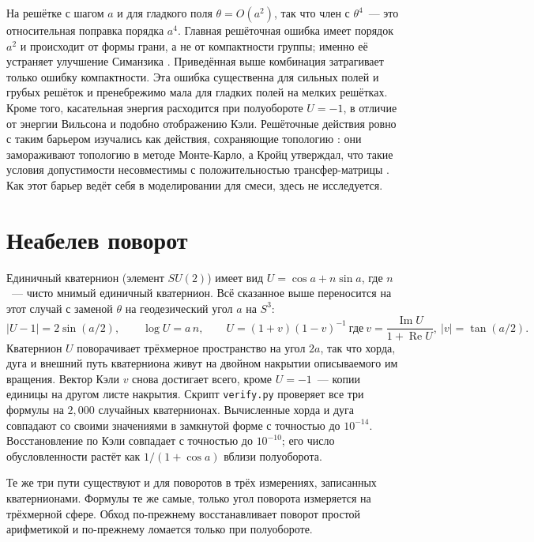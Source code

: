 \begin{remark}
На решётке с шагом $a$ и для гладкого поля $\theta=O(a^2)$, так что член с $\theta^4$~--- это
относительная поправка порядка $a^4$. Главная решёточная ошибка имеет порядок $a^2$ и
происходит от формы грани, а не от компактности группы; именно её устраняет улучшение
Симанзика \cite{lw}. Приведённая выше комбинация затрагивает только ошибку компактности.
Эта ошибка существенна для сильных полей и грубых решёток и пренебрежимо мала для гладких
полей на мелких решётках. Кроме того, касательная энергия расходится при полуобороте $U=-1$,
в отличие от энергии Вильсона и подобно отображению Кэли. Решёточные действия ровно с таким
барьером изучались как действия, сохраняющие топологию \cite{luscher,fukaya}: они замораживают
топологию в методе Монте-Карло, а Кройц утверждал, что такие условия допустимости несовместимы с
положительностью трансфер-матрицы \cite{creutz}. Как этот барьер ведёт себя в моделировании для
смеси, здесь не исследуется.
\end{remark}

\section{Неабелев поворот}\label{sec:su2}

Единичный кватернион (элемент $SU(2)$) имеет вид $U=\cos a+n\sin a$, где $n$~--- чисто мнимый
единичный кватернион. Всё сказанное выше переносится на этот случай с заменой $\theta$ на
геодезический угол $a$ на $S^3$:
\[
|U-1|=2\sin(a/2),\qquad \log U=a\,n,\qquad
U=(1+v)(1-v)^{-1}\ \text{где}\ v=\frac{\operatorname{Im}U}{1+\operatorname{Re}U},\ |v|=\tan(a/2).
\]
Кватернион $U$ поворачивает трёхмерное пространство на угол $2a$, так что хорда, дуга и внешний
путь кватерниона живут на двойном накрытии описываемого им вращения. Вектор Кэли $v$
снова достигает всего, кроме $U=-1$~--- копии единицы на другом листе накрытия.
Скрипт \texttt{verify.py} проверяет все три формулы на $2{,}000$ случайных кватернионах. Вычисленные хорда
и дуга совпадают со своими значениями в замкнутой форме с точностью до $10^{-14}$. Восстановление по Кэли совпадает с точностью до
$10^{-10}$; его число обусловленности растёт как $1/(1+\cos a)$ вблизи полуоборота.

\begin{plain}
Те же три пути существуют и для поворотов в трёх измерениях, записанных кватернионами.
Формулы те же самые, только угол поворота измеряется на трёхмерной сфере. Обход
по-прежнему восстанавливает поворот простой арифметикой и по-прежнему ломается только при
полуобороте.
\end{plain}

